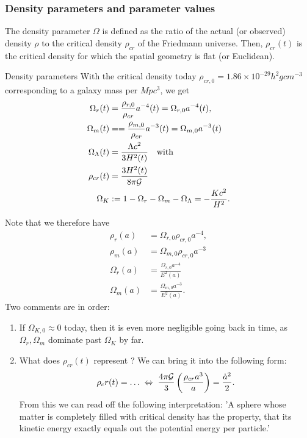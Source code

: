 \subsubsection{Density parameters and parameter values}
The density parameter $\Omega$ is defined as the ratio of the actual (or observed) density $\rho$ to the critical density $\rho_{cr}$ of the Friedmann universe. Then, $\rho_{cr}(t)$ is the critical density for which the spatial geometry is flat (or Euclidean).\\
\begin{mybox}{Density parameters}
With the critical density today $\rho_{cr,0}=1.86\times 10^{-29} h^2 g cm^{-3}$ corresponding to a galaxy mass per $Mpc^3$, we get
\begin{align}
	\Omega_r(t)&= \frac{\rho_{r,0}}{\rho_{cr}} a^{-4}(t)=\Omega_{r,0}a^{-4}(t),\\
	\Omega_m(t)&= = \frac{\rho_{m,0}}{\rho_{cr}} a^{-3}(t) = \Omega_{m,0} a^{-3}(t) \\
	\Omega_{\Lambda} (t) &= \frac{\Lambda c^2}{3 H^2(t)}\quad \text{with} \\
	\rho_{cr}(t)&= \frac{3 H^2(t)}{8 \pi \mathcal{G}} \\
	\Omega_K &:= 1-\Omega_{r}-\Omega_{m}-\Omega_{\Lambda}= - \frac{K c^2}{H^2}.
\end{align}
\end{mybox}
Note that we therefore have
\begin{align}
	\rho_r(a)&= \Omega_{r,0} \rho_{cr,0} a^{-4},\\
	\rho_m(a) &= \Omega_{m,0} \rho_{cr,0} a^{-3}\\
	\Omega_r(a) &= \frac{\Omega_{r,0} a^{-4}}{E^2(a)}\\
	\Omega_{m}(a) &= \frac{\Omega_{m,0} a^{-3}}{E^2(a)}.
\end{align}
Two comments are in order:
\begin{enumerate}
	\item If $\Omega_{K,0} \approx 0$ today, then it is even more negligible going back in time, as $\Omega_r,\Omega_m$ dominate past $\Omega_K$ by far.
	\item What does $\rho_{cr}(t)$ represent ? We can bring it into the following form:
	\begin{equation}
		\rho_cr(t) = \dots \; \Leftrightarrow \; \frac{4 \pi \mathcal{G}}{3} \left(\frac{\rho_{cr} a^3}{a}\right) = \frac{\dot{a}^2}{2}.
	\end{equation}
	From this we can read off the following interpretation: ’A sphere whose matter is completely filled with critical density has the property, that its kinetic energy exactly equals out the potential energy per particle.’
\end{enumerate}
